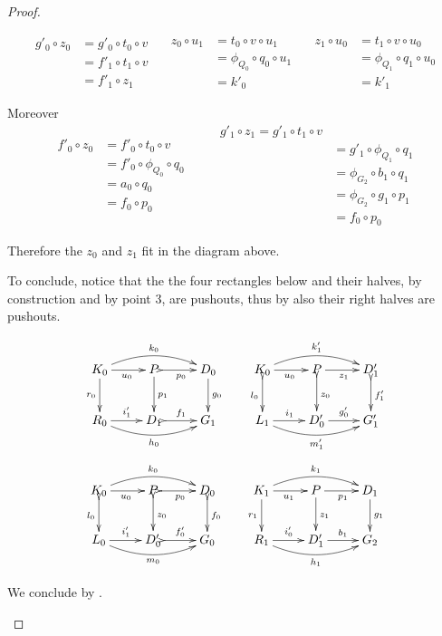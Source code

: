 \begin{proof}
\begin{enumerate}
		\[\begin{split}
		g'_0\circ z_0&=g'_0\circ t_0\circ v\\&=f'_1\circ t_1\circ v\\&=f'_1\circ z_1
		\end{split}\quad \begin{split}
		z_0\circ u_1&=t_0\circ v\circ u_1\\&=\phi_{Q_0}\circ q_0\circ u_1\\&=k'_0
		\end{split} \quad \begin{split}
		z_1\circ u_0&=t_1\circ v\circ u_0\\&=\phi_{Q_1}\circ q_1\circ u_0\\&=k'_1
		\end{split}\]
		
		Moreover
		\[\begin{split}
			f'_0\circ z_0&=f'_0\circ t_0\circ v\\&=f'_0\circ \phi_{Q_0}\circ q_0\\&=a_0\circ q_0\\&=f_0\circ p_0
		\end{split} \qquad \begin{split}
		g'_1\circ z_1=g'_1\circ t_1\circ v\\&=g'_1\circ \phi_{Q_1}\circ q_1\\&=\phi_{G_2}\circ b_1 \circ q_1\\&=\phi_{G_2}\circ g_1\circ p_1\\&=f_0\circ p_0
		\end{split} \]
		
		
		Therefore the $z_0$ and $z_1$ fit in the diagram above.
		
		To conclude, notice that the the four rectangles below and their halves, by construction and by point $3$, are pushouts, thus by  also their right halves are
		pushouts. 
		
		\[\xymatrix{K_0 \ar@/^.4cm/[rr]^{k_0}\ar[d]_{r_0}\ar[r]_{u_0}
			&P\ar[d]^{p_1} \ar@{>->}[r]_{p_0} & D_0 \ar[d]^{g_0}&K_0
			\ar@/^.4cm/[rr]^{k'_1}\ar@{>->}[d]_{l_0}\ar[r]_{u_0}
			&P\ar@{>->}[d]^{z_0} \ar[r]_{z_1} & D'_1 \ar@{>->}[d]^{f'_1}\\
			R_0 \ar@/_.4cm/[rr]_{h_0} \ar[r]^{i'_1}&D_1 \ar@{>->}[r]^{f_1}
			& G_1&L_1 \ar@/_.4cm/[rr]_{m'_1} \ar[r]^{i_1}&D'_0\ar[r]^{g'_0} &
			G'_1}\]
		\[\xymatrix{K_0
			\ar@/^.4cm/[rr]^{k_0}\ar@{>->}[d]_{l_0}\ar[r]_{u_0}
			&P\ar@{>->}[d]^{z_0} \ar@{>->}[r]_{p_0} & D_0
			\ar@{>->}[d]^{f_0}&K_1
			\ar@/^.4cm/[rr]^{k_1}\ar[d]_{r_1}\ar[r]_{u_1}
			&P\ar[d]^{z_1} \ar[r]_{p_1} & D_1 \ar[d]^{g_1}\\
			L_0 \ar@/_.4cm/[rr]_{m_0} \ar[r]^{i'_1}&D'_0 \ar@{>->}[r]^{f'_0}
			& G_0&R_1 \ar@/_.4cm/[rr]_{h_1} \ar[r]^{i'_0}&D'_1 \ar[r]^{b_1}
			& G_2}\]
			
			We conclude by . \qedhere 
	\end{enumerate}
\end{proof}


